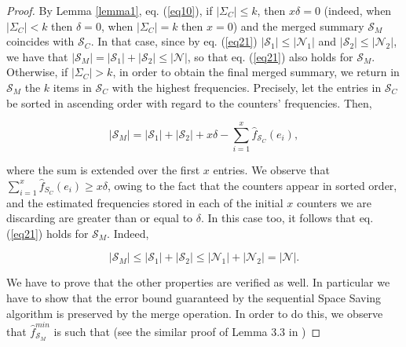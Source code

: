 \documentclass[final,3p,times]{elsarticle}
\newcommand\noi{\noindent}
\begin{document}
\begin{proof}
By Lemma \ref{lemma1}, eq. (\ref{eq10}), if $\left\vert{\Sigma_C}\right\vert \leq k$, then $x \delta = 0$ (indeed, when $\left\vert{\Sigma_C}\right\vert < k$  then $\delta = 0$, when $\left\vert{\Sigma_C}\right\vert = k$ then $x = 0$) and the merged summary $\mathcal{S}_M$ coincides with $\mathcal{S}_C$. In that case, since by eq. (\ref{eq21}) $\left\vert\mathcal{S}_1\right\vert \leq \left\vert\mathcal{N}_1\right\vert$ and $\left\vert\mathcal{S}_2\right\vert \leq \left\vert\mathcal{N}_2\right\vert$, we have that $\left\vert{\mathcal{S}_M}\right\vert = \left\vert{\mathcal{S}_1}\right\vert + \left\vert{\mathcal{S}_2}\right\vert \leq \left\vert{\mathcal{N}}\right\vert$, so that eq. (\ref{eq21}) also holds for $\mathcal{S}_M$. Otherwise, if $\left\vert{\Sigma_C}\right\vert > k$, in order to obtain the final merged summary, we return in $\mathcal{S}_M$ the $k$ items in $\mathcal{S}_C$ with the highest frequencies. Precisely, let the entries in $\mathcal{S}_C$ be sorted in ascending order with regard to the counters' frequencies. Then,


\begin{equation}
\label{eq22}
\left\vert{\mathcal{S}_M}\right\vert = \left\vert{\mathcal{S}_1}\right\vert + \left\vert{\mathcal{S}_2}\right\vert + x \delta - \sum_{i=1}^x \hat{f}_{\mathcal{S}_C}(e_i),
\end{equation}

\noi where the sum is extended over the first $x$ entries. We observe that $\sum_{i=1}^x \hat{f}_{S_C}(e_i) \geq x \delta$, owing to the fact that the counters appear in sorted order, and the estimated frequencies stored in each of the initial $x$ counters we are discarding are greater than or equal to $\delta$. In this case too, it follows that eq. (\ref{eq21}) holds for $\mathcal{S}_M$. Indeed,

\begin{equation}
\label{eq23}
\left\vert{\mathcal{S}_M}\right\vert \leq \left\vert{\mathcal{S}_1}\right\vert + \left\vert{\mathcal{S}_2}\right\vert \leq \left\vert{\mathcal{N}_1}\right\vert + \left\vert{\mathcal{N}_2}\right\vert = \left\vert{\mathcal{N}}\right\vert.
\end{equation}

We have to prove that the other properties are verified as well. In particular we have to show that the error bound guaranteed by the sequential Space Saving algorithm is preserved by the merge operation. In order to do this, we observe that $\hat{f}_{\mathcal{S}_M}^{min}$ is such that (see the similar proof of Lemma 3.3 in \cite{Metwally2006})


\end{proof}
\end{document}
